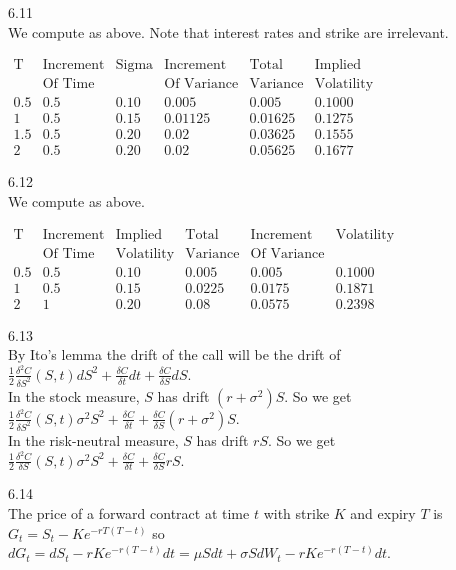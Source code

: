 6.11 \\
We compute as above. Note that interest rates and strike are irrelevant.

$
\begin{matrix}
\text{T} & \text{Increment} & \text{Sigma} & \text{Increment} & \text{Total} & \text{Implied} \\
\text{ } & \text{Of Time} & \text{ } & \text{Of Variance} & \text{Variance} & \text{Volatility} \\
0.5 & 0.5 & 0.10 & 0.005 & 0.005 & 0.1000 \\
1 & 0.5 & 0.15 & 0.01125 & 0.01625 & 0.1275 \\
1.5 & 0.5 & 0.20 & 0.02 & 0.03625 & 0.1555 \\
2 & 0.5 & 0.20 & 0.02 & 0.05625 & 0.1677
\end{matrix}
$

6.12 \\
We compute as above.

$
\begin{matrix}
\text{T} & \text{Increment} & \text{Implied} & \text{Total} & \text{Increment} & \text{Volatility} \\
\text{ } & \text{Of Time} & \text{Volatility} & \text{Variance} & \text{Of Variance} & \text{ } \\
0.5 & 0.5 & 0.10 & 0.005 & 0.005 & 0.1000 \\
1 & 0.5 & 0.15 & 0.0225 & 0.0175 & 0.1871 \\
2 & 1 & 0.20 & 0.08 & 0.0575 & 0.2398
\end{matrix}
$

6.13 \\
By Ito's lemma the drift of the call will be the drift of \\
$\frac{1}{2} \frac{\delta^2 C}{\delta S^2} (S,t) dS^2 + \frac{\delta C}{\delta t}dt + \frac{\delta C}{\delta S} dS$. \\
In the stock measure, $S$ has drift $(r+\sigma^2)S$. So we get \\
$\frac{1}{2} \frac{\delta^2 C}{\delta S^2} (S,t) \sigma^2 S^2 + \frac{\delta C}{\delta t} + \frac{\delta C}{\delta S} (r+\sigma^2)S$. \\
In the risk-neutral measure, $S$ has drift $rS$. So we get \\
$\frac{1}{2} \frac{\delta^2 C}{\delta S} (S,t) \sigma^2 S^2 + \frac{\delta C}{\delta t} + \frac{\delta C}{\delta S} rS$.

6.14 \\
The price of a forward contract at time $t$ with strike $K$ and expiry $T$ is \\
$G_t = S_t - K e^{-rT(T-t)}$ so \\
$dG_t = dS_t - rKe^{-r(T-t)}dt = \mu S dt + \sigma S dW_t - rKe^{-r(T-t)}dt$.

